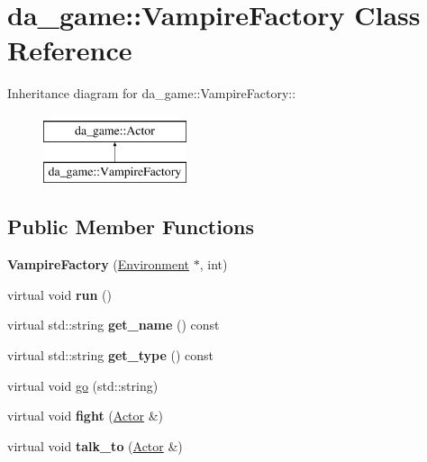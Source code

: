 \hypertarget{classda__game_1_1VampireFactory}{
\section{da\_\-game::VampireFactory Class Reference}
\label{classda__game_1_1VampireFactory}
}
Inheritance diagram for da\_\-game::VampireFactory::\begin{figure}[H]
\begin{center}
\leavevmode
\includegraphics[height=2cm]{classda__game_1_1VampireFactory}
\end{center}
\end{figure}
\subsection*{Public Member Functions}
\begin{DoxyCompactItemize}
\item 
\hypertarget{classda__game_1_1VampireFactory_a9a3e0ab44708348be1caf55d7de920d5}{
{\bfseries VampireFactory} (\hyperlink{classda__game_1_1Environment}{Environment} $\ast$, int)}
\label{classda__game_1_1VampireFactory_a9a3e0ab44708348be1caf55d7de920d5}

\item 
\hypertarget{classda__game_1_1VampireFactory_a5981dc60b9f6fae2ce999e4555106d79}{
virtual void {\bfseries run} ()}
\label{classda__game_1_1VampireFactory_a5981dc60b9f6fae2ce999e4555106d79}

\item 
\hypertarget{classda__game_1_1VampireFactory_a9e156f9b668e710fb81cc4c0028cde17}{
virtual std::string {\bfseries get\_\-name} () const }
\label{classda__game_1_1VampireFactory_a9e156f9b668e710fb81cc4c0028cde17}

\item 
\hypertarget{classda__game_1_1VampireFactory_a4f48868efb55fb3b85c89738a0ab7c7d}{
virtual std::string {\bfseries get\_\-type} () const }
\label{classda__game_1_1VampireFactory_a4f48868efb55fb3b85c89738a0ab7c7d}

\item 
virtual void \hyperlink{classda__game_1_1VampireFactory_ab8f8fffebef4af1a90d00a0f011b245b}{go} (std::string)
\item 
\hypertarget{classda__game_1_1VampireFactory_a45b83b5acb2b73c475b9833119b9763b}{
virtual void {\bfseries fight} (\hyperlink{classda__game_1_1Actor}{Actor} \&)}
\label{classda__game_1_1VampireFactory_a45b83b5acb2b73c475b9833119b9763b}

\item 
\hypertarget{classda__game_1_1VampireFactory_a6cc92702b9e963c5e62340ec4036cd39}{
virtual void {\bfseries talk\_\-to} (\hyperlink{classda__game_1_1Actor}{Actor} \&)}
\label{classda__game_1_1VampireFactory_a6cc92702b9e963c5e62340ec4036cd39}

\end{DoxyCompactItemize}


